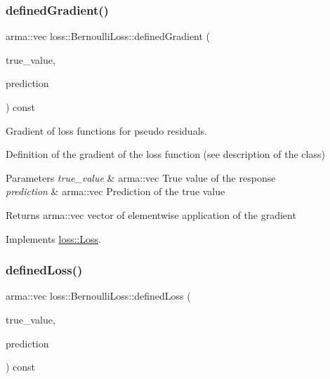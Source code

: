 \mbox{\label{classloss_1_1_bernoulli_loss_a2dc644172cea3eb84f1af5aa9217c04a}} 
\subsubsection{\texorpdfstring{defined\+Gradient()}{definedGradient()}}
{\footnotesize\ttfamily arma\+::vec loss\+::\+Bernoulli\+Loss\+::defined\+Gradient (\begin{DoxyParamCaption}\item[{const arma\+::vec \&}]{true\+\_\+value,  }\item[{const arma\+::vec \&}]{prediction }\end{DoxyParamCaption}) const\hspace{0.3cm}{\ttfamily [virtual]}}



Gradient of loss functions for pseudo residuals. 

Definition of the gradient of the loss function (see description of the class)


\begin{DoxyParams}{Parameters}
{\em true\+\_\+value} & {\ttfamily arma\+::vec} True value of the response \\
\hline
{\em prediction} & {\ttfamily arma\+::vec} Prediction of the true value\\
\hline
\end{DoxyParams}
\begin{DoxyReturn}{Returns}
{\ttfamily arma\+::vec} vector of elementwise application of the gradient 
\end{DoxyReturn}


Implements \mbox{\hyperlink{classloss_1_1_loss_a267a4de70747ade4b2d84ce35a448979}{loss\+::\+Loss}}.

\mbox{\label{classloss_1_1_bernoulli_loss_a1e347cacc5a5925874f579834f421236}} 
\subsubsection{\texorpdfstring{defined\+Loss()}{definedLoss()}}
{\footnotesize\ttfamily arma\+::vec loss\+::\+Bernoulli\+Loss\+::defined\+Loss (\begin{DoxyParamCaption}\item[{const arma\+::vec \&}]{true\+\_\+value,  }\item[{const arma\+::vec \&}]{prediction }\end{DoxyParamCaption}) const\hspace{0.3cm}{\ttfamily [virtual]}}



